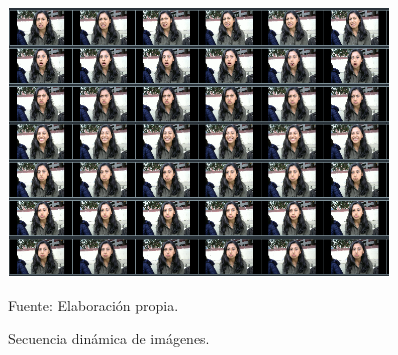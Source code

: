 \begin{figure}[ht]
\begin{center}
\includegraphics[width=0.9\textwidth]{Imagen27}
\end{center}
\begin{center}
\vskip -0.5cm
\caption{\small{Secuencia dinámica de imágenes.}}
{\small{Fuente: Elaboración propia.}}
\end{center}
\end{figure}

